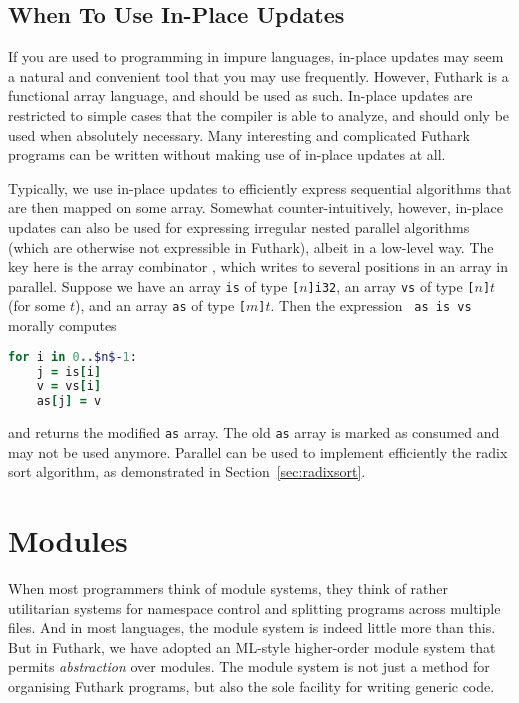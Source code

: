\documentclass[oneside,11pt]{book}
\begin{document}
\subsection{When To Use In-Place Updates}

If you are used to programming in impure languages, in-place updates
may seem a natural and convenient tool that you may use frequently.
However, Futhark is a functional array language, and should be used as
such.  In-place updates are restricted to simple cases that the
compiler is able to analyze, and should only be used when absolutely
necessary.  Many interesting and complicated Futhark programs can be
written without making use of in-place updates at all.

Typically, we use in-place updates to efficiently express sequential
algorithms that are then mapped on some array.  Somewhat
counter-intuitively, however, in-place updates can also be used for
expressing irregular nested parallel algorithms (which are otherwise
not expressible in Futhark), albeit in a low-level way.  The key here
is the array combinator , which writes to several
positions in an array in parallel.  Suppose we have an array
\texttt{is} of type \texttt{[$n$]i32}, an array \texttt{vs} of type
\texttt{[$n$]$t$} (for some \texttt{$t$}), and an array \texttt{as} of
type \texttt{[$m$]$t$}. Then the expression \texttt{ as is vs}
morally computes

\begin{lstlisting}[language=ruby,mathescape=true]
  for i in 0..$n$-1:
    j = is[i]
    v = vs[i]
    as[j] = v
\end{lstlisting}

\noindent
and returns the modified \texttt{as} array.  The old \texttt{as} array
is marked as consumed and may not be used anymore.  Parallel
 can be used to implement efficiently the radix sort algorithm, as demonstrated in Section~\ref{sec:radixsort}.

\section{Modules}
\label{sec:modules}

When most programmers think of module systems, they think of rather
utilitarian systems for namespace control and splitting programs
across multiple files.  And in most languages, the module system is
indeed little more than this.  But in Futhark, we have adopted an
ML-style higher-order module system that permits \textit{abstraction}
over modules.  The module system is not just a method for organising
Futhark programs, but also the sole facility for writing generic code.
\end{document}
